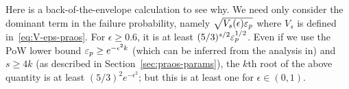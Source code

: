 % 





Here is a back-of-the-envelope calculation to see why. 
We need only consider the dominant term in the failure probability, 
namely $\sqrt{V_s(\epsilon) \mathsf{\varepsilon}_p}$ where $V_s$ is defined in~\eqref{eq:V-eps-praos}. 
For $\epsilon \geq 0.6$, it is at least $(5/3)^{s/2} \mathsf{\varepsilon}_p^{1/2}$. 
Even if we use the PoW lower bound $\mathsf{\varepsilon}_p \geq e^{-\epsilon^2 k}$ 
(which can be inferred from the analysis in\cite{Nakamoto2008}) 
and $s \geq 4 k$ (as described in Section~\ref{sec:praos-params}),
the $k$th root of the above quantity 
is at least $(5/3)^2 e^{-\epsilon^2}$; 
but this is at least one for $\epsilon \in (0,1)$.

